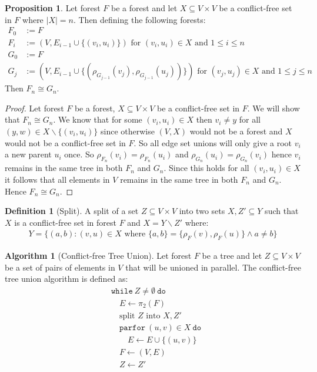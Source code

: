 \documentclass[a4paper,12pt]{article}
\theoremstyle{definition}
\newtheorem{definition}{Definition}[section]
\newtheorem{proposition}{Proposition}[section]
\newtheorem{algorithm}{Algorithm}[section]
\newcommand{\kw}[1]{\ensuremath{\mathtt{#1}}}
\begin{document}
\begin{proposition}
    Let forest $F$ be a forest and let $X \subseteq V \times V$ be a
    conflict-free set in $F$ where $|X| = n$. Then defining the following forests:
    \begin{align*}
        F_0 &:= F \\
        F_{i} &:= (V, E_{i - 1} \cup \{(v_i, u_i)\}) \text{ for } (v_i, u_i) \in X \text{ and } 1 \leq i \leq n \\
        G_0 &:= F \\
        G_{j} &:= (V, E_{i - 1} \cup \{(\rho_{G_{j - 1}}(v_j), \rho_{G_{j - 1}}(u_j))\}) \text{ for } (v_j, u_j) \in X \text{ and } 1 \leq j \leq n
    \end{align*}
    Then $F_{n} \cong G_{n}$.
\end{proposition}
\begin{proof}
    Let forest $F$ be a forest, $X \subseteq V \times V$ be a conflict-free set
    in $F$. We will show that $F_n \cong G_n$. We know that for some $(v_i, u_i)
    \in X$ then $v_i \neq y$ for all  $(y, w) \in X \backslash \{(v_i, u_i)\}$
    since otherwise $(V, X)$ would not be a forest and $X$ would not be a
    conflict-free set in $F$. So all edge set unions will only give a root $v_i$
    a new parent $u_i$ once. So $\rho_{F_n}(v_i) = \rho_{F_n}(u_i)$ and
    $\rho_{G_n}(u_i) = \rho_{G_n}(v_i)$ hence $v_i$ remains in the same tree in
    both $F_n$ and $G_n$. Since this holds for all $(v_i, u_i) \in X$ it follows
    that all elements in $V$ remains in the same tree in both $F_n$ and $G_n$.
    Hence $F_n \cong G_n$.
\end{proof}


\begin{definition}[Split]
    A split of a set $Z \subseteq V \times V$ into two sets $X, Z' \subseteq Y$
    such that $X$ is a conflict-free set in forest $F$ and $X = Y \backslash Z'$
    where: 
    \begin{align*}
        Y = \{(a, b) : (v, u) \in X \text{ where } \{a, b\} = \{\rho_F(v), \rho_F(u)\} \land a \neq b \}
    \end{align*}
\end{definition}

\begin{algorithm}[Conflict-free Tree Union]
    Let forest $F$ be a tree and let $Z \subseteq V \times V$ be a set of pairs
    of elements in $V$ that will be unioned in parallel. The conflict-free tree
    union algorithm is defined as:
    \begin{align*}
        & \kw{while} \: Z \neq \emptyset \: \kw{do} \\
        & \quad E \leftarrow \pi_2(F) \\
        & \quad \text{split } Z \text{ into } X, Z' \\
        & \quad \kw{parfor} \: (u, v) \in X \: \kw{do} \\
        & \quad \quad E \leftarrow E \cup \{(u, v)\} \\
        & \quad F \leftarrow (V, E) \\
        & \quad Z \leftarrow Z'
    \end{align*}
\end{algorithm}
\end{document}
